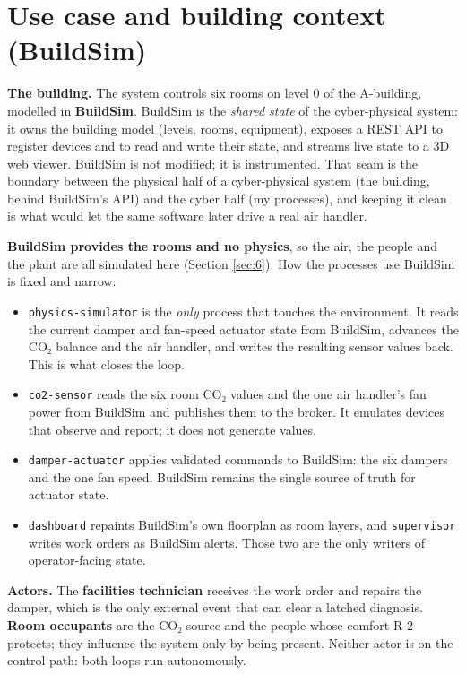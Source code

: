 \section{Use case and building context (BuildSim)}\label{sec:2}

\textbf{The building.} The system controls six rooms on level 0 of the A-building, modelled in
\textbf{BuildSim}. BuildSim is the \emph{shared state} of the cyber-physical system: it owns the
building model (levels, rooms, equipment), exposes a REST API to register devices and to read and
write their state, and streams live state to a 3D web viewer. BuildSim is not modified; it is
instrumented. That seam is the boundary between the physical half of a cyber-physical system (the
building, behind BuildSim's API) and the cyber half (my processes), and keeping it clean is what
would let the same software later drive a real air handler.

\textbf{BuildSim provides the rooms and no physics}, so the air, the people and the plant are all
simulated here (Section \ref{sec:6}). How the processes use BuildSim is fixed and narrow:

\begin{itemize}
\tightlist
\item \texttt{physics-simulator} is the \emph{only} process that touches the environment. It reads
  the current damper and fan-speed actuator state from BuildSim, advances the CO₂ balance and the
  air handler, and writes the resulting sensor values back. This is what closes the loop.
\item \texttt{co2-sensor} reads the six room CO₂ values and the one air handler's fan power from
  BuildSim and publishes them to the broker. It emulates devices that observe and report; it does
  not generate values.
\item \texttt{damper-actuator} applies validated commands to BuildSim: the six dampers and the
  one fan speed. BuildSim remains the single source of truth for actuator state.
\item \texttt{dashboard} repaints BuildSim's own floorplan as room layers, and \texttt{supervisor}
  writes work orders as BuildSim alerts. Those two are the only writers of operator-facing state.
\end{itemize}

\textbf{Actors.} The \textbf{facilities technician} receives the work order and repairs the
damper, which is the only external event that can clear a latched diagnosis. \textbf{Room
occupants} are the CO₂ source and the people whose comfort R-2 protects; they influence the system
only by being present. Neither actor is on the control path: both loops run autonomously.

